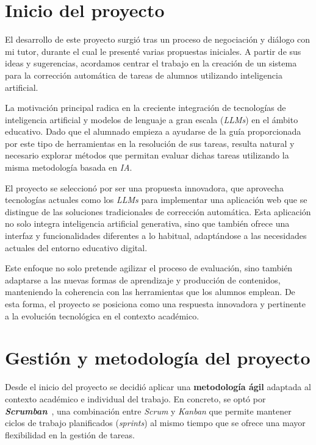 
\section{Inicio del proyecto}

El desarrollo de este proyecto surgió tras un proceso de negociación y diálogo con mi tutor, 
durante el cual le presenté varias propuestas iniciales. A partir de sus ideas y sugerencias, 
acordamos centrar el trabajo en la creación de un sistema para la corrección automática de 
tareas de alumnos utilizando inteligencia artificial.

La motivación principal radica en la creciente integración de tecnologías de inteligencia artificial 
y modelos de lenguaje a gran escala (\textit{LLMs}) en el ámbito educativo. Dado que el alumnado empieza a 
ayudarse de la guía proporcionada por este tipo de herramientas en la resolución de sus tareas, 
resulta natural y necesario explorar métodos que permitan 
evaluar dichas tareas utilizando la misma metodología basada en \textit{IA}.

El proyecto se seleccionó por ser una propuesta innovadora, que aprovecha tecnologías actuales 
como los \textit{LLMs} para implementar una aplicación web que se distingue de las soluciones tradicionales 
de corrección automática. Esta aplicación no solo integra inteligencia artificial generativa, sino que 
también ofrece una interfaz y funcionalidades diferentes a lo habitual, adaptándose a las necesidades 
actuales del entorno educativo digital.

Este enfoque no solo pretende agilizar el proceso de evaluación, sino también adaptarse a las nuevas 
formas de aprendizaje y producción de contenidos, manteniendo la coherencia con las herramientas que 
los alumnos emplean. De esta forma, el proyecto se posiciona como una respuesta innovadora y pertinente 
a la evolución tecnológica en el contexto académico.

\section{Gestión y metodología del proyecto}

Desde el inicio del proyecto se decidió aplicar una \textbf{metodología ágil} adaptada al contexto académico e individual del trabajo. 
En concreto, se optó por \textbf{\textit{Scrumban}}~\cite{web:scrumban}, una combinación entre \textit{Scrum} y \textit{Kanban} que permite mantener ciclos de trabajo planificados 
(\textit{sprints}) al mismo tiempo que se ofrece una mayor flexibilidad en la gestión de tareas.

